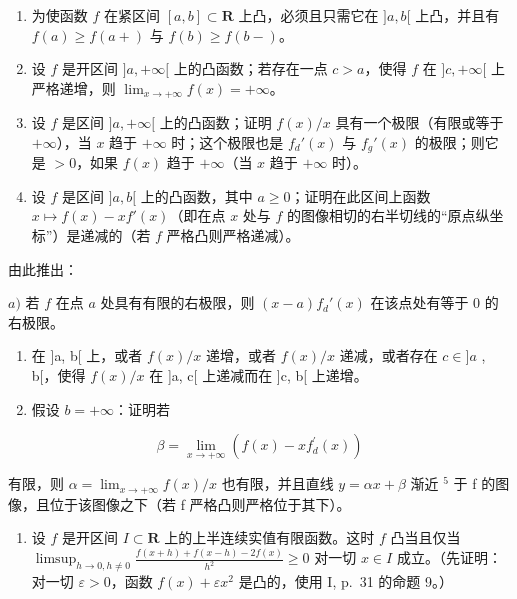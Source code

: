 \begin{enumerate}
\def\labelenumi{\arabic{enumi})}
\setcounter{enumi}{3}
\item
  为使函数 \(f\) 在紧区间 \([a, b] \subset \mathbf{R}\) 上凸，必须且只需它在 \(]a, b[\) 上凸，并且有 \(f(a) \geqslant f(a+)\) 与 \(f(b) \geqslant f(b-)\)。
\item
  设 \(f\) 是开区间 \(]a, +\infty[\) 上的凸函数；若存在一点 \(c > a\)，使得 \(f\) 在 \(]c, +\infty[\) 上严格递增，则 \(\lim_{x \to +\infty} f(x) = +\infty\)。
\item
  设 \(f\) 是区间 \(]a, +\infty[\) 上的凸函数；证明 \(f(x)/x\) 具有一个极限（有限或等于 \(+\infty\)），当 \(x\) 趋于 \(+\infty\) 时；这个极限也是 \(f_d'(x)\) 与 \(f_g'(x)\) 的极限；则它是 \(>0\)，如果 \(f(x)\) 趋于 \(+\infty\)（当 \(x\) 趋于 \(+\infty\) 时）。
\item
  设 \(f\) 是区间 \(]a, b[\) 上的凸函数，其中 \(a \geqslant 0\)；证明在此区间上函数 \(x \mapsto f(x) - xf'(x)\)（即在点 \(x\) 处与 \(f\) 的图像相切的右半切线的“原点纵坐标”）是递减的（若 \(f\) 严格凸则严格递减）。
\end{enumerate}

由此推出：

\(a)\) 若 \(f\) 在点 \(a\) 处具有有限的右极限，则 \((x - a)f_d'(x)\) 在该点处有等于 0 的右极限。

\begin{enumerate}
\def\labelenumi{\alph{enumi})}
\setcounter{enumi}{1}
\item
  在 {]}a, b{[} 上，或者 \(f(x)/x\) 递增，或者 \(f(x)/x\) 递减，或者存在 \(c \in ]a\) , b{[}，使得 \(f(x)/x\) 在 {]}a, c{[} 上递减而在 {]}c, b{[} 上递增。
\item
  假设 \(b = +\infty\)：证明若
\end{enumerate}

\[
\beta = \lim _ {x \rightarrow + \infty} \left(f (x) - x f _ {d} ^ {\prime} (x)\right)
\]

有限，则 \(\alpha = \lim_{x \to +\infty} f(x) / x\) 也有限，并且直线 \(y = \alpha x + \beta\) 渐近 \(^{5}\) 于 f 的图像，且位于该图像之下（若 f 严格凸则严格位于其下）。

\begin{enumerate}
\def\labelenumi{\arabic{enumi})}
\setcounter{enumi}{7}
\tightlist
\item
  设 \(f\) 是开区间 \(I \subset \mathbf{R}\) 上的上半连续实值有限函数。这时 \(f\) 凸当且仅当 \(\limsup_{h \to 0, h \neq 0} \frac{f(x + h) + f(x - h) - 2f(x)}{h^2} \geqslant 0\) 对一切 \(x \in I\) 成立。（先证明：对一切 \(\varepsilon > 0\)，函数 \(f(x) + \varepsilon x^2\) 是凸的，使用 I, p.~31 的命题 9。）
\end{enumerate}

